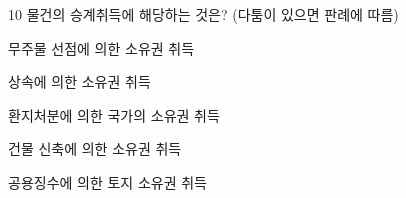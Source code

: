 \begin{question}{10}
물건의 승계취득에 해당하는 것은? (다툼이 있으면 판례에 따름)
\begin{choices}
  \item 무주물 선점에 의한 소유권 취득
  \item 상속에 의한 소유권 취득
  \item 환지처분에 의한 국가의 소유권 취득
  \item 건물 신축에 의한 소유권 취득
  \item 공용징수에 의한 토지 소유권 취득
\end{choices}
\end{question}
